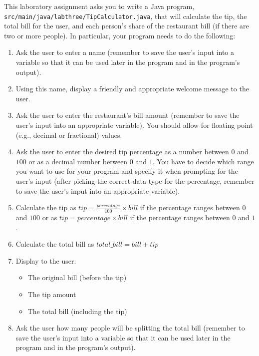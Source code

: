 \documentclass[11pt]{article}
\newcommand{\mainprogramsource}{\lstinline{src/main/java/labthree/TipCalculator.java}}
\begin{document}
This laboratory assignment asks you to write a Java program, \mainprogramsource{}, that will calculate the tip, the
total bill for the user, and each person's share of the restaurant bill (if there are two or more people). In
particular, your program needs to do the following:

\vspace*{-.1in}
\begin{enumerate}

  \item Ask the user to enter a name (remember to save the user's input into a variable so that it can be used later in
    the program and in the program's output).

  \item Using this name, display a friendly and appropriate welcome message to the user.

  \item Ask the user to enter the restaurant's bill amount (remember to save the user's input into an appropriate
    variable). You should allow for floating point (e.g., decimal or fractional) values.

  \item Ask the user to enter the desired tip percentage as a number between $0$ and $100$ or as a decimal number between
    $0$ and $1$. You have to decide which range you want to use for your program and specify it when prompting for the
    user's input (after picking the correct data type for the percentage, remember to save the user's input into an
    appropriate variable).

  \item Calculate the tip as $tip = \frac{percentage}{100} \times bill$ if the percentage ranges between $0$ and $100$ or
    as $tip = percentage \times bill$ if the percentage ranges between $0$ and $1$.

  \item Calculate the total bill as $total\_bill = bill+tip$

  \item Display to the user:
    \begin{itemize}
      \item The original bill (before the tip)
      \item The tip amount
      \item The total bill (including the tip)
    \end{itemize}

  \item Ask the user how many people will be splitting the total bill (remember to save the user's input into a variable
    so that it can be used later in the program and in the program's output).


\end{enumerate}
\end{document}
